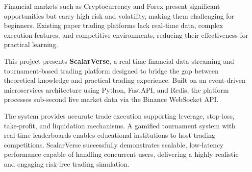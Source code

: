 \vspace{-1cm}

Financial markets such as Cryptocurrency and Forex present significant opportunities but carry high risk and volatility, making them challenging for beginners. Existing paper trading platforms lack real-time data, complex execution features, and competitive environments, reducing their effectiveness for practical learning. 

This project presents \textbf{ScalarVerse}, a real-time financial data streaming and tournament-based trading platform designed to bridge the gap between theoretical knowledge and practical trading experience. Built on an event-driven microservices architecture using Python, FastAPI, and Redis, the platform processes sub-second live market data via the Binance WebSocket API. 

The system provides accurate trade execution supporting leverage, stop-loss, take-profit, and liquidation mechanisms. A gamified tournament system with real-time leaderboards enables educational institutions to host trading competitions. ScalarVerse successfully demonstrates scalable, low-latency performance capable of handling concurrent users, delivering a highly realistic and engaging risk-free trading simulation.

\pagebreak
